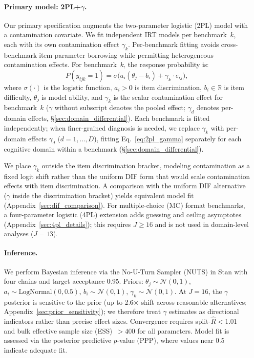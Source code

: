 \paragraph{Primary model: 2PL+$\gamma$.}
Our primary specification augments the two-parameter logistic (2PL) model \citep{lord_1980_irt,hambleton_1991_irt} with a contamination covariate. We fit independent IRT models per benchmark~$k$, each with its own contamination effect $\gamma_k$. Per-benchmark fitting avoids cross-benchmark item parameter borrowing while permitting heterogeneous contamination effects. For benchmark~$k$, the response probability is:
\begin{equation}
\label{eq:2pl_gamma}
    P(y_{ijk} = 1) = \sigma\!\bigl(a_i(\theta_j - b_i) + \gamma_k \cdot e_{ij}\bigr),
\end{equation}
where $\sigma(\cdot)$ is the logistic function, $a_i > 0$ is item discrimination, $b_i \in \mathbb{R}$ is item difficulty, $\theta_j$ is model ability, and $\gamma_k$ is the scalar contamination effect for benchmark~$k$ ($\gamma$ without subscript denotes the pooled effect; $\gamma_d$ denotes per-domain effects, \S\ref{sec:domain_differential}). Each benchmark is fitted independently; when finer-grained diagnosis is needed, we replace $\gamma_k$ with per-domain effects $\gamma_d$ ($d=1,\ldots,D$), fitting Eq.~\eqref{eq:2pl_gamma} separately for each cognitive domain within a benchmark (\S\ref{sec:domain_differential}).

We place $\gamma_k$ outside the item discrimination bracket, modeling contamination as a fixed logit shift \citep{de_ayala_2009_irt} rather than the uniform DIF form that would scale contamination effects with item discrimination. A comparison with the uniform DIF alternative ($\gamma$ inside the discrimination bracket) yields equivalent model fit (Appendix~\ref{sec:dif_comparison}). For multiple-choice (MC) format benchmarks, a four-parameter logistic (4PL) extension adds guessing and ceiling asymptotes (Appendix~\ref{sec:4pl_details}); this requires $J \geq 16$ and is not used in domain-level analyses ($J = 13$).

\paragraph{Inference.}
We perform Bayesian inference via the No-U-Turn Sampler (NUTS) \citep{hoffman2014} in Stan \citep{carpenter2017} with four chains and target acceptance 0.95. Priors: $\theta_j \sim \mathcal{N}(0,1)$, $a_i \sim \text{LogNormal}(0, 0.5)$, $b_i \sim \mathcal{N}(0,1)$, $\gamma_k \sim \mathcal{N}(0,1)$. At $J=16$, the $\gamma$ posterior is sensitive to the prior (up to 2.6$\times$ shift across reasonable alternatives; Appendix~\ref{sec:prior_sensitivity}); we therefore treat $\gamma$ estimates as directional indicators rather than precise effect sizes. Convergence requires split-$\hat{R} < 1.01$ and bulk effective sample size (ESS)~$> 400$ for all parameters. Model fit is assessed via the posterior predictive $p$-value (PPP), where values near 0.5 indicate adequate fit.

